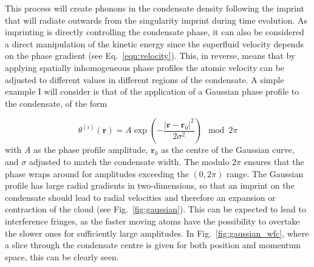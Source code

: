 {This process will create phonons in the condensate density following the imprint that will radiate outwards from the singularity imprint during time evolution. As imprinting is directly controlling the condensate phase, it can also be considered a direct manipulation of the kinetic energy since the superfluid velocity depends on the phase gradient (see Eq.~\eqref{eqn:velocity}). This, in reverse, means that by applying spatially inhomogeneous phase profiles the atomic velocity can be adjusted to different values in different regions of the condensate. A simple example I will consider is that of the application of a Gaussian phase profile to the condensate, of the form

\begin{equation}
    \theta^{(i)}(\mathbf{r}) = A\exp\left( -\frac{ |\mathbf{r}-\mathbf{r}_0|^2 }{2\sigma^2 } \right) \mod 2\pi
\end{equation}
with $A$ as the phase profile amplitude, $\mathbf{r}_0$ as the centre of the Gaussian curve, and $\sigma$ adjusted to match the condensate width. The modulo $2\pi$ ensures that the phase wraps around for amplitudes exceeding the $(0,2\pi)$ range. The Gaussian profile has large radial gradients in two-dimensions, so that an imprint on the condensate should lead to radial velocities and therefore an expansion or contraction of the cloud (see Fig.~\ref{fig:gaussian}). This can be expected to lead to interference fringes, as the faster moving atoms have the possibility to overtake the slower ones for sufficiently large amplitudes. In Fig.~\ref{fig:gaussian_wfc}, where a slice through the condensate centre is given for both position and momentum space, this can be clearly seen. %

}
